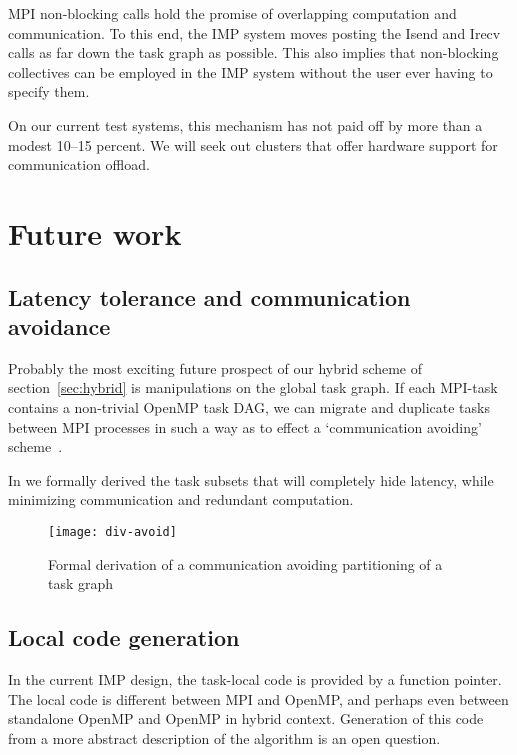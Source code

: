 \documentclass[11pt,fleqn,preprint]{impreport}
\begin{document}
MPI non-blocking calls hold the promise of overlapping computation and communication.
To this end, the IMP system moves posting the Isend and Irecv calls as far down the task
graph as possible. This also implies that non-blocking collectives can be employed
in the IMP system without the user ever having to specify them.

On our current test systems, this mechanism has not paid off by more than a modest 10--15
percent. We will seek out clusters that offer hardware support for communication offload.

\section{Future work}

\subsection{Latency tolerance and communication avoidance}
\label{sec:future-hybrid}

Probably the most exciting future prospect of our hybrid scheme of section~\ref{sec:hybrid}
is manipulations on the global task graph. If each MPI-task contains a non-trivial OpenMP
task \ac{DAG}, we can migrate and duplicate tasks between MPI processes in such
a way as to effect a `communication avoiding' scheme~\cite{Demmel2008IEEE:avoiding}.

In  we formally derived the task subsets that will completely hide
latency, while minimizing communication and redundant computation. 

\begin{figure}[ht]
  \texttt{[image: div-avoid]}
  \caption{Formal derivation of a communication avoiding partitioning of a task graph}
  \label{fig:avoid}
\end{figure}

\subsection{Local code generation}
\label{sec:local}

In the current IMP design, the task-local code is provided by a function pointer.
The local code is different between MPI and OpenMP, and perhaps even between standalone OpenMP
and OpenMP in hybrid context. Generation of this code from a more abstract description of the
algorithm is an open question.
\end{document}
